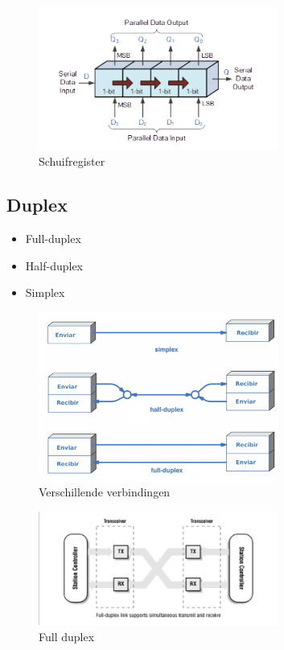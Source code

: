\documentclass{article}
\begin{document}
\begin{figure}[H]
    \centering
    \includegraphics[width=0.7\textwidth]{Screenshot_20200323_115735.png}
    \caption{Schuifregister}
\end{figure}

\subsection{Duplex}
\begin{itemize}
    \item Full-duplex
    \item Half-duplex
    \item Simplex
\end{itemize}

\begin{figure}[H]
    \centering
    \includegraphics[width=0.7\textwidth]{Screenshot_20200323_115925.png}
    \caption{Verschillende verbindingen}
\end{figure}

\begin{figure}[H]
    \centering
    \includegraphics[width=0.7\textwidth]{Screenshot_20200323_120141.png}
    \caption{Full duplex}
\end{figure}
\end{document}

